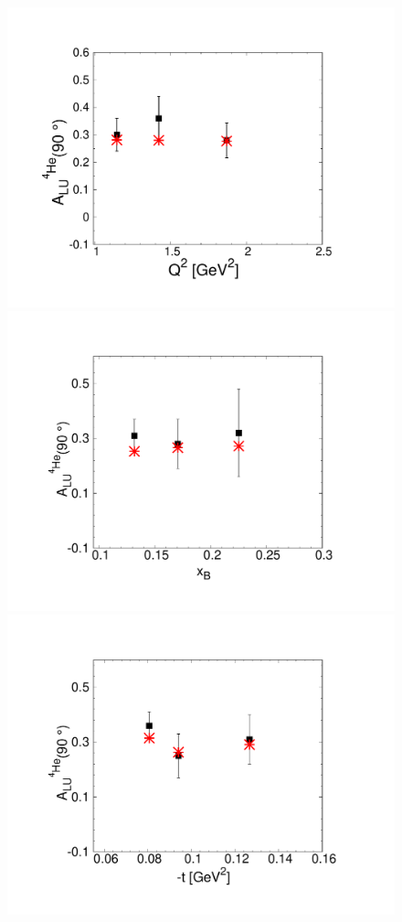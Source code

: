 \begin{figure}[t]
\includegraphics[scale=0.28]{plots/aluq2.pdf}
\includegraphics[scale=0.28]{plots/aluxb.pdf}
\includegraphics[scale=0.28]{plots/alut.pdf}

\end{figure}
